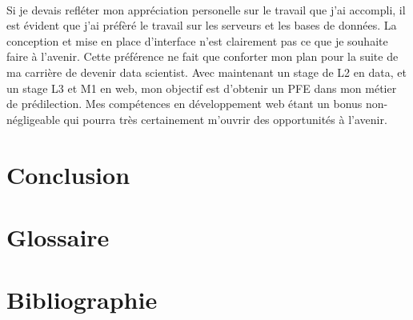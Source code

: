 \documentclass[12pt]{article}
\begin{document}
\begin {sloppypar}
\paragraph{}
Si je devais refléter mon appréciation personelle sur le travail que j'ai accompli, il est évident que j'ai préfèré
le travail sur les serveurs et les bases de données. La conception et mise en place d'interface n'est clairement pas ce 
que je souhaite faire à l'avenir. Cette préférence ne fait que conforter mon plan pour la suite de ma carrière 
de devenir data scientist. Avec maintenant un stage de L2 en data, et un stage L3 et M1 en web, mon objectif 
est d'obtenir un PFE dans mon métier de prédilection. Mes compétences en développement web étant un bonus
non-négligeable qui pourra très certainement m'ouvrir des opportunités à l'avenir.
\section{Conclusion}
\newpage
\section{Glossaire}
\newpage
\section{Bibliographie}
\end{sloppypar}
\end{document}
